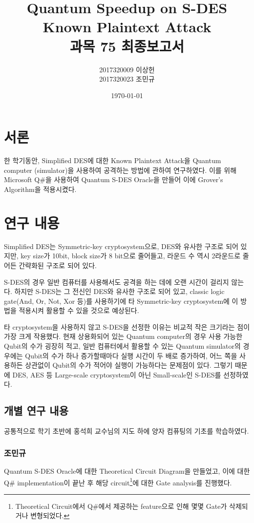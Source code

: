 \documentclass{article}
\title{Quantum Speedup on S-DES Known Plaintext Attack\\\large 과목 75 최종보고서}
\author{2017320009 이상헌\\2017320023 조민규}
\date{\today}
\theoremstyle{break}
\begin{document}
	\maketitle
	
	\section{서론}
	
	한 학기동안, Simplified DES에 대한 Known Plaintext Attack을 Quantum computer (simulator)을 사용하여 공격하는 방법에 관하여 연구하였다. 이를 위해 Microsoft Q\#을 사용하여 Quantum S-DES Oracle을 만들어 이에 Grover’s Algorithm을 적용시켰다.
	
	\section{연구 내용}
	
	Simplified DES는 Symmetric-key cryptosystem으로, DES와 유사한 구조로 되어 있지만, key size가 10bit, block size가 8 bit으로 줄어들고, 라운드 수 역시 2라운드로 줄어든 간략화된 구조로 되어 있다.
	
	S-DES의 경우 일반 컴퓨터를 사용해서도 공격을 하는 데에 오랜 시간이 걸리지 않는다. 하지만 S-DES는 그 전신인 DES와 유사한 구조로 되어 있고, classic logic gate(And, Or, Not, Xor 등)를 사용하기에 타 Symmetric-key cryptosystem에 이 방법을 적용시켜 활용할 수 있을 것으로 예상된다.
	
	타 cryptosystem을 사용하지 않고 S-DES을 선정한 이유는 비교적 작은 크기라는 점이 가장 크게 작용했다. 현재 상용화되어 있는 Quantum computer의 경우 사용 가능한 Qubit의 수가 굉장히 적고, 일반 컴퓨터에서 활용할 수 있는 Quantum simulator의 경우에는 Qubit의 수가 하나 증가할때마다 실행 시간이 두 배로 증가하여, 어느 쪽을 사용하든 상관없이 Qubit의 수가 적어야 실행이 가능하다는 문제점이 있다. 그렇기 때문에 DES, AES 등 Large-scale cryptosystem이 아닌 Small-scale인 S-DES를 선정하였다.
	
	\subsection{개별 연구 내용}
	공통적으로 학기 초반에 홍석희 교수님의 지도 하에 양자 컴퓨팅의 기초를 학습하였다.
    
	\subsubsection{조민규}
	
	Quantum S-DES Oracle에 대한 Theoretical Circuit Diagram을 만들었고, 이에 대한 Q\# implementation이 끝난 후 해당 circuit\footnote{Theoretical Circuit에서 Q\#에서 제공하는 feature으로 인해 몇몇 Gate가 삭제되거나 변형되었다.}에 대한 Gate analysis를 진행했다.
	
\end{document}
